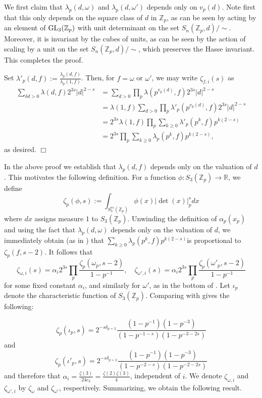 \documentclass{article}
\def\Z{{\mathbb Z}}
\def\GL{{\rm GL}}
\def\R{{\mathbb R}}
\def\Z{{\mathbb Z}}
\newenvironment{proof}{\noindent {\bf Proof:}}{$\Box$ \vspace{2 ex}}
\begin{document}
\begin{proof}
We first claim that $\lambda_p(d,\omega)$ and $\lambda_p(d,\omega')$ depends only on $v_p(d)$. Note first that this only depends on the square class of $d$ in $\Z_p$, as can be seen by acting by an element of $\GL_3(\Z_p)$ with unit determinant on the set $S_n(\Z_p,d)/\sim$. 
Moreover, it is invariant by the cubes of units, as can be seen by the action of scaling by a unit on the set $S_n(\Z_p,d)/\sim$, which preserves the Hasse invariant. This completes the proof. 

Set $\lambda'_p(d,f):=\frac{\lambda_p(d,f)}{\lambda_p(1,f)}$. Then,  for $f=\omega$ or $\omega'$, we may write $\zeta_{f,i}(s)$ as
\begin{align*}
\sum_{\delta d>0} \lambda(d,f)2^{3s} |d|^{2-s}
&=\sum_{d>0} \prod_p\lambda(p^{v_p(d)},f)2^{3s} |d|^{2-s}\\
&=\lambda(1,f)\sum_{d>0}  \prod_p\lambda'_p(p^{v_p(d)},f)2^{3s} |d|^{2-s}\\
&=2^{3s}\lambda(1,f)\prod_p\sum_{k\geq 0}\lambda'_p(p^k,f) p^{k(2-s)}\\
&=2^{3s}\prod_p\sum_{k\geq 0}\lambda_p(p^k,f) p^{k(2-s)},
\end{align*}  
as desired.
\end{proof}




In the above proof we establish that $\lambda_p(d,f)$ depends only on the valuation of $d$. This motivates the following definition. For a function $\phi:S_3(\Z_p)\to\R$, we define $$\zeta_p(\phi,s):= \int_{S_3^{ss}(\Z_p)}\phi(x) |\det(x)|_p^s dx$$ where $dx$ assigns measure $1$ to $S_3(\Z_p)$. Unwinding the definition of $\alpha_p(x_p)$ and using the fact that $\lambda_p(d,\omega)$ depends only on the valuation of $d$, we immediately obtain (as in \cite[p.1109]{ibukiyamasaitoI}) that $\sum_{k\geq 0}\lambda_p(p^k,f) p^{k(2-s)}$is proportional to $\zeta_p(f,s-2)$. It follows that 
\begin{equation}
\zeta_{\omega,i}(s)=\alpha_i2^{3s}\prod_p \frac{\zeta_p(\omega_p,s-2)}{1-p^{-1}}, \quad
\zeta_{\omega',i}(s)=\alpha_i2^{3s}\prod_p \frac{\zeta_p(\omega'_p,s-2)}{1-p^{-1}}
\end{equation}
for some fixed constant $\alpha_i$, and similarly for $\omega'$, as in the bottom of \cite[P. 1108]{ibukiyamasaitoI}.
Let $\iota_p$ denote the characteristic function of $S_3(\Z_p)$. Comparing with \cite[Thm 1.2]{ibukiyamasaitoI} gives the following: 

\begin{equation}\label{eqref:3x32ndmainterms}
\zeta_p(\iota_p,s)=2^{-s\delta_{p=2}}\frac{(1-p^{-1})(1-p^{-3})}{(1-p^{-1-s})(1-p^{-3-2s})} 
\end{equation}
and
\begin{equation}\label{eqref:3x32ndmainterms}
\zeta_p(\iota'_p,s)=2^{-s\delta_{p=2}}\frac{(1-p^{-1})(1-p^{-3})}{(1-p^{-2-s})(1-p^{-2-2s})} 
\end{equation}
and therefore that $\alpha_i=\frac{\zeta(3)}{24c_3} = \frac{\zeta(2)\zeta(3)}{4}$, independent of $i$. We denote $\zeta_{\omega,i}$ and $\zeta_{\omega',i}$ by $\zeta_\omega$ and $\zeta_{\omega'}$, respectively. Summarizing, we obtain the following result.
\end{document}
